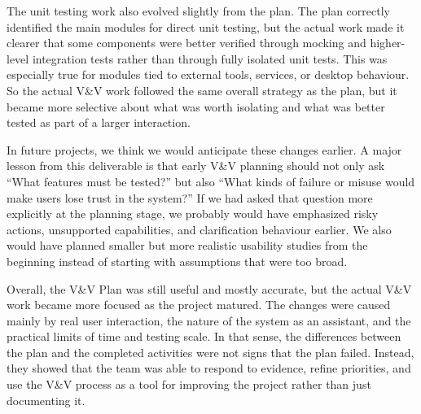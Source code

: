 \documentclass[12pt]{article}
\begin{document}
\begin{enumerate}
The unit testing work also evolved slightly from the plan. The plan
correctly identified the main modules for direct unit testing, but the
actual work made it clearer that some components were better verified
through mocking and higher-level integration tests rather than through
fully isolated unit tests. This was especially true for modules tied to
external tools, services, or desktop behaviour. So the actual V\&V work
followed the same overall strategy as the plan, but it became more
selective about what was worth isolating and what was better tested as
part of a larger interaction.

In future projects, we think we would anticipate these changes earlier.
A major lesson from this deliverable is that early V\&V planning should
not only ask ``What features must be tested?'' but also ``What kinds of
failure or misuse would make users lose trust in the system?'' If we had
asked that question more explicitly at the planning stage, we probably
would have emphasized risky actions, unsupported capabilities, and
clarification behaviour earlier. We also would have planned smaller but
more realistic usability studies from the beginning instead of starting
with assumptions that were too broad.

Overall, the V\&V Plan was still useful and mostly accurate, but the
actual V\&V work became more focused as the project matured. The changes
were caused mainly by real user interaction, the nature of the system as
an assistant, and the practical limits of time and testing scale. In
that sense, the differences between the plan and the completed
activities were not signs that the plan failed. Instead, they showed
that the team was able to respond to evidence, refine priorities, and
use the V\&V process as a tool for improving the project rather than
just documenting it.

\end{enumerate}
\end{document}
